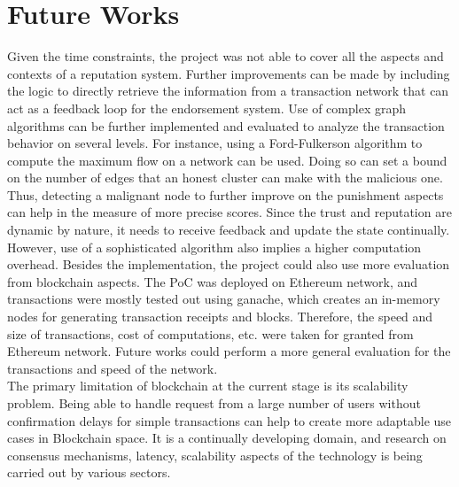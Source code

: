 \section{Future Works}
Given the time constraints, the project was not able to cover all the aspects
and contexts of a reputation system. Further improvements can be made by
including the logic to directly retrieve the information from a transaction
network that can act as a feedback loop for the endorsement system. Use of
complex graph algorithms can be further implemented and evaluated to analyze
the transaction behavior on several levels.  For instance, using a
Ford-Fulkerson algorithm to compute the maximum flow on a network can be used.
Doing so can set a bound on the number of edges that an honest cluster can make
with the malicious one. Thus, detecting a malignant node to further improve on
the punishment aspects can help in the measure of more precise scores. Since
the trust and reputation are dynamic by nature, it needs to receive feedback
and update the state continually. However, use of a sophisticated algorithm
also implies a higher computation overhead.  Besides the implementation, the
project could also use more evaluation from blockchain aspects. The PoC was
deployed on Ethereum network, and transactions were mostly tested out using
ganache, which creates an in-memory nodes for generating transaction receipts
and blocks. Therefore, the speed and size of transactions, cost of
computations, etc. were taken for granted from Ethereum network. Future works
could perform a more general evaluation for the transactions and speed of the
network. \\
The primary limitation of blockchain at the current stage is its scalability
problem. Being able to handle request from a large number of users without
confirmation delays for simple transactions can help to create more adaptable
use cases in Blockchain space. It is a continually developing domain, and
research on consensus mechanisms, latency, scalability aspects of the
technology is being carried out by various sectors.





%
%

